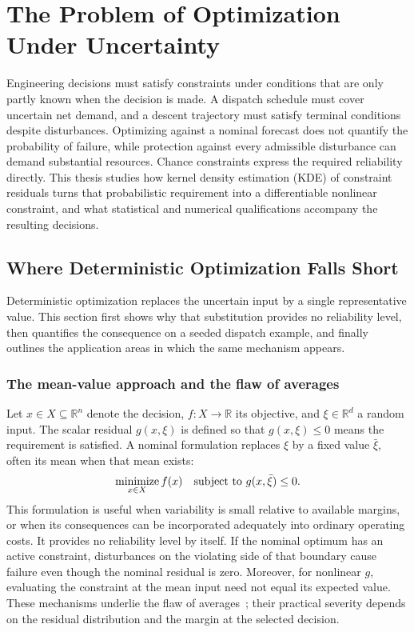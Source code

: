 \graphicspath{{kap01/figures/}{./figures/}}
\section{The Problem of Optimization Under Uncertainty}\label{ch:problem}
Engineering decisions must satisfy constraints under conditions that are only partly known when the decision is made. A dispatch schedule must cover uncertain net demand, and a descent trajectory must satisfy terminal conditions despite disturbances. Optimizing against a nominal forecast does not quantify the probability of failure, while protection against every admissible disturbance can demand substantial resources. Chance constraints express the required reliability directly. This thesis studies how kernel density estimation (KDE) of constraint residuals turns that probabilistic requirement into a differentiable nonlinear constraint, and what statistical and numerical qualifications accompany the resulting decisions.

\subsection{Where Deterministic Optimization Falls Short}\label{sec:deterministic}
Deterministic optimization replaces the uncertain input by a single representative value. This section first shows why that substitution provides no reliability level, then quantifies the consequence on a seeded dispatch example, and finally outlines the application areas in which the same mechanism appears.

\subsubsection{The mean-value approach and the flaw of averages}\label{ssec:meanvalue}
Let $x\in X\subseteq\mathbb R^n$ denote the decision, $f:X\to\mathbb R$ its objective, and $\xi\in\mathbb R^d$ a random input. The scalar residual $g(x,\xi)$ is defined so that $g(x,\xi)\le0$ means the requirement is satisfied. A nominal formulation replaces $\xi$ by a fixed value $\bar\xi$, often its mean when that mean exists:
\begin{equation}
  \operatorname*{minimize}_{x\in X} f(x)
  \quad\text{subject to }g(x,\bar\xi)\le0.
  \label{eq:detNLP}
\end{equation}
This formulation is useful when variability is small relative to available margins, or when its consequences can be incorporated adequately into ordinary operating costs. It provides no reliability level by itself. If the nominal optimum has an active constraint, disturbances on the violating side of that boundary cause failure even though the nominal residual is zero. Moreover, for nonlinear $g$, evaluating the constraint at the mean input need not equal its expected value. These mechanisms underlie the flaw of averages~\citep{savage2009}; their practical severity depends on the residual distribution and the margin at the selected decision.

